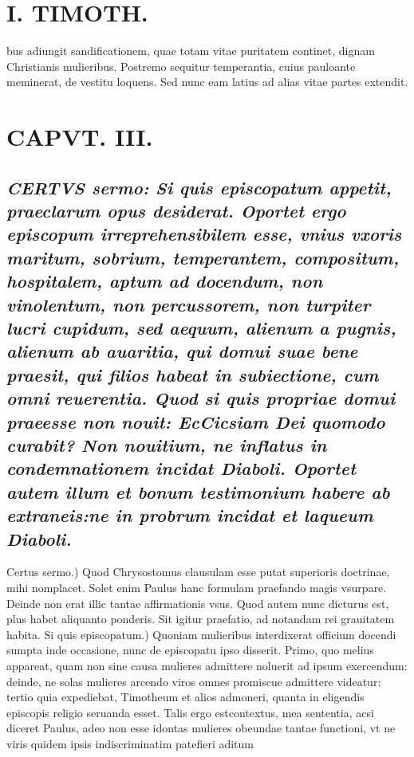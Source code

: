 \documentclass{article}
\begin{document}
\begin{pages}
\section*{I. TIMOTH. }
\marginpar{[ p.30 ]}\pstart bus adiungit sandificationem, quae totam vitae puritatem continet, dignam Christianis mulieribus. Postremo sequitur temperantia, cuius pauloante meminerat, de vestitu loquens. Sed nunc eam latius ad alias vitae partes extendit.  \pend
\endnumbering\beginnumbering\section{CAPVT. III.}
{}
\subsection*{\textit{\huge\textbf{C}\normalsize ERTVS sermo: Si quis episcopatum appetit, praeclarum opus desiderat. Oportet ergo episcopum irreprehensibilem esse, vnius vxoris maritum, sobrium, temperantem, compositum, hospitalem, aptum ad docendum, non vinolentum, non percussorem, non turpiter lucri cupidum, sed aequum, alienum a pugnis, alienum ab auaritia, qui domui suae bene praesit, qui filios habeat in subiectione, cum omni reuerentia. Quod si quis propriae domui praeesse non nouit: EcCicsiam Dei quomodo curabit? Non nouitium, ne inflatus in condemnationem incidat Diaboli. Oportet autem illum et bonum testimonium habere ab extraneis:ne in probrum incidat et laqueum Diaboli. }}\pstart Certus sermo.) Quod Chrysostomus clausulam esse putat superioris doctrinae, mihi nomplacet. Solet enim Paulus hanc formulam praefando magis vsurpare. Deinde non erat illic tantae affirmationis vsus. Quod autem nunc dicturus est, plus habet aliquanto ponderis. Sit igitur praefatio, ad notandam rei grauitatem  \pend\pstart habita. Si quis episcopatum.) Quoniam mulieribus interdixerat officium docendi sumpta inde occasione, nunc de episcopatu ipso disserit. Primo, quo melius appareat, quam non sine causa mulieres admittere noluerit ad ipsum exercendum: deinde, ne solas mulieres arcendo viros omnes promiscue admittere videatur: tertio quia expediebat, Timotheum et alios admoneri, quanta in eligendis episcopis religio seruanda esset. Talis ergo estcontextus, mea sententia, acsi diceret Paulus, adeo non esse idontas mulieres obeundae tantae functioni, vt ne viris quidem ipsis indiscriminatim patefieri aditum  \pend
\endnumbering
\end{pages}
\end{document}
